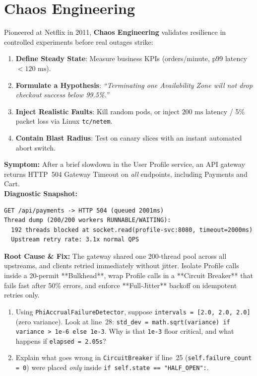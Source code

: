 \section{Chaos Engineering}

Pioneered at Netflix in 2011, \textbf{Chaos Engineering} validates resilience in controlled experiments before real outages strike:
\begin{enumerate}[leftmargin=18pt]
  \item \textbf{Define Steady State}: Measure business KPIs (orders/minute, p99 latency $< 120\text{ ms}$).
  \item \textbf{Formulate a Hypothesis}: \emph{``Terminating one Availability Zone will not drop checkout success below 99.5\%.''}
  \item \textbf{Inject Realistic Faults}: Kill random pods, or inject $200\text{ ms}$ latency / 5\% packet loss via Linux \texttt{tc/netem}.
  \item \textbf{Contain Blast Radius}: Test on canary slices with an instant automated abort switch.
\end{enumerate}

\begin{realworldbox}
\textbf{Symptom:} After a brief slowdown in the User Profile service, an API gateway returns HTTP~504 Gateway Timeout on \emph{all} endpoints, including Payments and Cart.\\
\textbf{Diagnostic Snapshot:}
\begin{verbatim}
GET /api/payments -> HTTP 504 (queued 2001ms)
Thread dump (200/200 workers RUNNABLE/WAITING):
  192 threads blocked at socket.read(profile-svc:8080, timeout=2000ms)
  Upstream retry rate: 3.1x normal QPS
\end{verbatim}
\textbf{Root Cause \& Fix:} The gateway shared one 200-thread pool across all upstreams, and clients retried immediately without jitter. Isolate Profile calls inside a 20-permit **Bulkhead**, wrap Profile calls in a **Circuit Breaker** that fails fast after 50\% errors, and enforce **Full-Jitter** backoff on idempotent retries only.
\end{realworldbox}

\begin{tryityourselfbox}
\begin{enumerate}[leftmargin=18pt]
  \item Using \texttt{PhiAccrualFailureDetector}, suppose \texttt{intervals = [2.0, 2.0, 2.0]} (zero variance). Look at line~28: \texttt{std\_dev = math.sqrt(variance) if variance > 1e-6 else 1e-3}. Why is that \texttt{1e-3} floor critical, and what happens if \texttt{elapsed = 2.05s}?
  \item Explain what goes wrong in \texttt{CircuitBreaker} if line~25 (\texttt{self.failure\_count = 0}) were placed \emph{only} inside \texttt{if self.state == "HALF\_OPEN":}.
\end{enumerate}
\end{tryityourselfbox}

